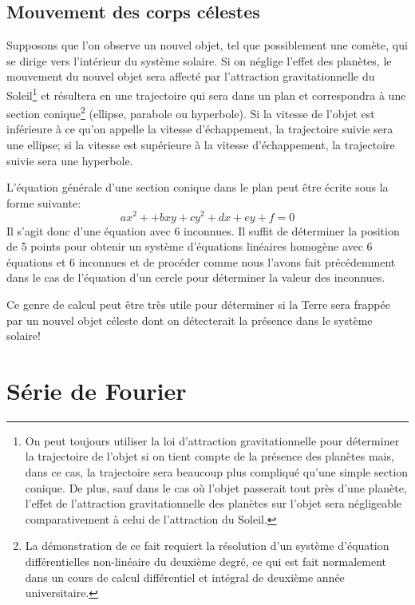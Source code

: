 \subsection{Mouvement des corps célestes}

Supposons que l'on observe un nouvel objet, tel que possiblement une comète, qui se dirige
vers l'intérieur du système solaire.  Si on néglige l'effet des planètes, le mouvement du
nouvel objet sera affecté par l'attraction gravitationnelle du Soleil\footnote{On peut toujours utiliser
la loi d'attraction gravitationnelle pour déterminer la trajectoire de l'objet si on tient compte de
la présence des planètes mais, dans ce cas, la trajectoire sera beaucoup plus compliqué qu'une simple
section conique.  De plus, sauf dans le cas où l'objet passerait tout près d'une planète, l'effet
de l'attraction gravitationnelle des planètes sur l'objet sera négligeable comparativement
à celui de l'attraction du Soleil.} et résultera en une trajectoire qui sera dans un plan et correspondra
à une section conique\footnote{La démonstration de ce fait requiert la résolution d'un système
d'équation différentielles non-linéaire du deuxième degré, ce qui est fait normalement dans un cours
de calcul différentiel et intégral de deuxième année universitaire.} (ellipse, parabole ou hyperbole).  
Si la vitesse de l'objet est inférieure à ce qu'on
appelle la vitesse d'échappement, la trajectoire suivie sera une ellipse; si la vitesse est supérieure
à la vitesse d'échappement, la trajectoire suivie sera une hyperbole.  

L'équation générale d'une section conique dans le plan peut être écrite sous la forme suivante:
\[
a x^2 + + bxy + cy^2 + dx + ey + f = 0
\]
Il s'agit donc d'une équation avec 6 inconnues.  Il suffit de déterminer la position de 5 points pour 
obtenir un système d'équations linéaires homogène avec 6 équations et 6 inconnues et de procéder comme
nous l'avons fait précédemment dans le cas de l'équation d'un cercle pour déterminer la valeur des inconnues.

Ce genre de calcul peut être très utile pour déterminer si la Terre sera frappée par un nouvel objet céleste
dont on détecterait la présence dans le système solaire!

\section{Série de Fourier}

